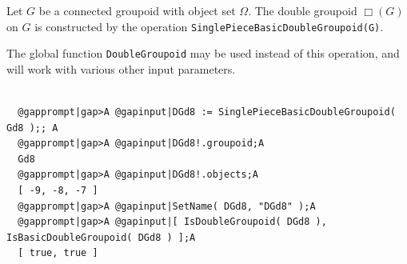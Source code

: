 \documentclass[a4paper,11pt]{report}
\begin{document}
{{{ Let $G$ be a connected groupoid with object set $\Omega$. The double groupoid $\Box(G)$ on $G$ is constructed by the operation \texttt{SinglePieceBasicDoubleGroupoid(G)}. 

 The global function \texttt{DoubleGroupoid} may be used instead of this operation, and will work with various other input
parameters. 

 }

 
\begin{Verbatim}[commandchars=@|A,fontsize=\small,frame=single,label=Example]
  
  @gapprompt|gap>A @gapinput|DGd8 := SinglePieceBasicDoubleGroupoid( Gd8 );; A
  @gapprompt|gap>A @gapinput|DGd8!.groupoid;A
  Gd8
  @gapprompt|gap>A @gapinput|DGd8!.objects;A
  [ -9, -8, -7 ]
  @gapprompt|gap>A @gapinput|SetName( DGd8, "DGd8" );A
  @gapprompt|gap>A @gapinput|[ IsDoubleGroupoid( DGd8 ), IsBasicDoubleGroupoid( DGd8 ) ];A
  [ true, true ]
  
\end{Verbatim}
 

}}
\end{document}
